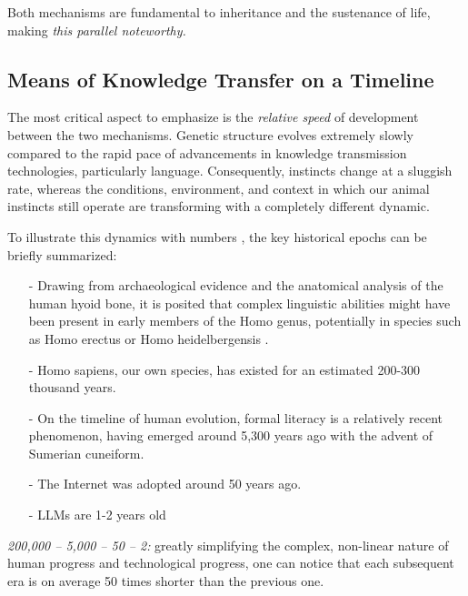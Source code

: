 \documentclass[11pt,a4]{article}
\begin{document}
    \par
    Both mechanisms are fundamental to inheritance and
    the sustenance of life, making \textit{this parallel noteworthy.}





    \subsection{Means of Knowledge Transfer on a Timeline}
    The most critical aspect to emphasize is the \textit{relative speed} of
    development between the two mechanisms. Genetic structure evolves extremely
    slowly compared to the rapid pace of advancements in knowledge transmission
    technologies, particularly language. Consequently, instincts change at a
    sluggish rate, whereas the conditions, environment, and context in
    which our animal instincts still operate are transforming with a
    completely different dynamic.
    \par
    To illustrate this dynamics with numbers , the
    key historical epochs can be briefly summarized:

        \begin{itemize}
            \item[-] Drawing from archaeological evidence and the anatomical analysis of the human hyoid bone,
            it is posited that complex linguistic abilities might have been present in early members of the
            Homo genus, potentially in species such as Homo erectus or Homo heidelbergensis \cite{Capasso2008AHE}.
            \item[-] Homo sapiens, our own species, has existed for an estimated 200-300 thousand
            years\cite{Vidal}.
            \item[-] On the timeline of human evolution, formal literacy is a relatively recent
            phenomenon, having emerged around 5,300 years ago with the advent of Sumerian cuneiform\cite{Walker}.
            \item[-] The Internet was adopted around 50 years ago.
            \item[-] LLMs are 1-2 years old
        \end{itemize}

        \textit{200,000 – 5,000 – 50 – 2:}
        greatly simplifying the complex, non-linear nature of human progress and technological progress,
         one can notice that each subsequent era is on average 50 times shorter than the previous one.
\end{document}
